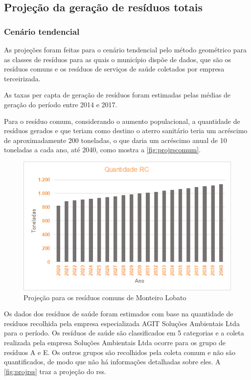 \subsection{Projeção da geração de resíduos totais}

\subsubsection{Cenário tendencial}

As projeções foram feitas para o cenário tendencial pelo método geométrico para as classes de resíduos para as quais o município dispõe de dados, que são os resíduos comuns e os resíduos de serviços de saúde coletados por empresa terceirizada. 

%

As taxas per capta de geração de resíduos foram estimadas pelas médias de geração do período entre 2014 e 2017. 

Para o resíduo comum, considerando o aumento populacional, a quantidade de resíduos gerados e que teriam como destino o aterro sanitário teria um acréscimo de aproximadamente 200 toneladas, o que daria um acréscimo anual de 10 toneladas a cada ano, até 2040, como mostra a \autoref{fig:projrscomum}.

 \begin{figure}[h]
 	\centering
 	\includegraphics[width=0.7\linewidth]{produtos/prodquatro/proj_rs_comum}
 	\caption{Projeção para os resíduos comuns de Monteiro Lobato}
 	\label{fig:projrscomum}
 \end{figure}

Os dados dos resíduos de saúde foram estimados com base na quantidade de resíduos recolhida pela empresa especializada AGIT Soluções Ambientais Ltda para o período. Os resíduos de saúde são classificados em 5 categorias %
e a coleta realizada pela empresa Soluções Ambientais Ltda ocorre para os grupo de resíduos A e E. Os outros grupos são recolhidos pela coleta comum e não são quantificados, de modo que não há informações detalhadas sobre eles. A \autoref{fig:projrss} traz a projeção do \gls{rss}.

